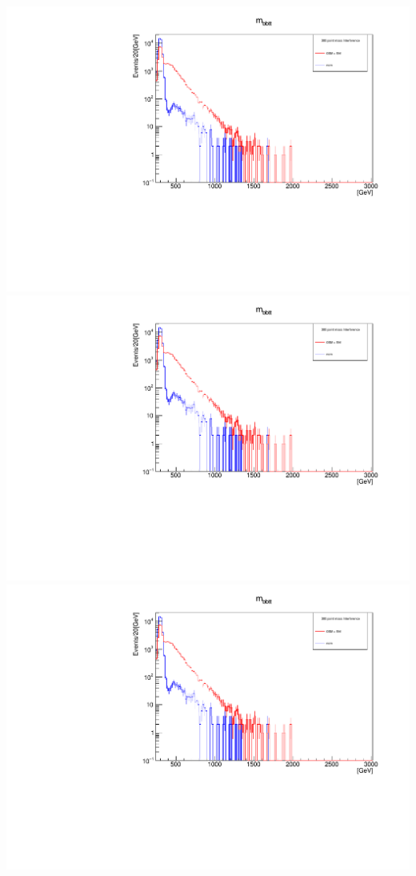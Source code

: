\documentclass[a4wide,10pt]{article}
\begin{document}
\includegraphics[scale=0.50,page=4]{InterferencePlots03p.pdf}
\includegraphics[scale=0.50,page=5]{InterferencePlots03p.pdf}
\includegraphics[scale=0.50,page=6]{InterferencePlots03p.pdf}
\end{document}

